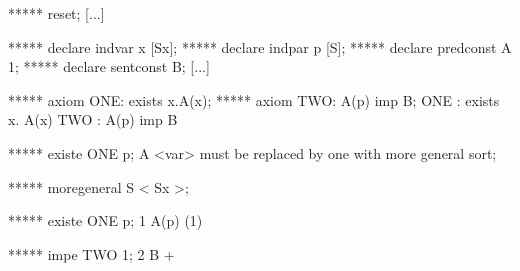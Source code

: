    ***** reset;
   [...]

   ***** declare indvar x [Sx];
   ***** declare indpar p [S];
   ***** declare predconst A 1;
   ***** declare sentconst B;
   [...]

   ***** axiom ONE: exists x.A(x);
   ***** axiom TWO: A(p) imp B;
   ONE : exists x. A(x)
   TWO : A(p) imp B

   ***** existe ONE p;
   A <var> must be replaced by one with more general sort;

   ***** moregeneral S < Sx >;

   ***** existe ONE p;
   1   A(p)     (1)

   ***** impe TWO 1;
   2   B
+


